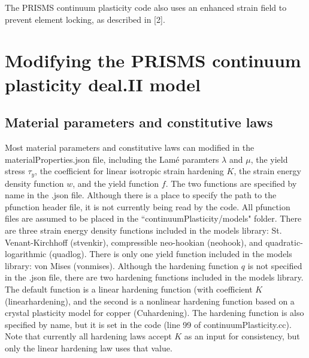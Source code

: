 \documentclass[10pt]{article}
\begin{document}
The PRISMS continuum plasticity code also uses an enhanced strain field to prevent element locking, as described in [2].

\pagebreak

\section{Modifying the PRISMS continuum plasticity deal.II model}

\subsection{Material parameters and constitutive laws}
Most material parameters and constitutive laws can modified in the materialProperties.json file, including the Lam\'e paramters $\lambda$ and $\mu$, the yield stress $\tau_y$, the coefficient for linear isotropic strain hardening $K$, the strain energy density function $w$, and the yield function $f$. The two functions are specified by name in the .json file. Although there is a place to specify the path to the pfunction header file, it is not currently being read by the code. All pfunction files are assumed to be placed in the ``continuumPlasticity/models" folder. There are three strain energy density functions included in the models library: St. Venant-Kirchhoff (stvenkir), compressible neo-hookian (neohook), and quadratic-logarithmic (quadlog). There is only one yield function included in the models library: von Mises (von\textunderscore mises). Although the hardening function $q$ is not specified in the .json file, there are two hardening functions included in the models library. The default function is a linear hardening function (with coefficient $K$ (linear\textunderscore hardening), and the second is a nonlinear hardening function based on a crystal plasticity model for copper (Cu\textunderscore hardening). The hardening function is also specified by name, but it is set in the code (line 99 of continuumPlasticity.cc). Note that currently all hardening laws accept $K$ as an input for consistency, but only the linear hardening law uses that value.
\end{document}
